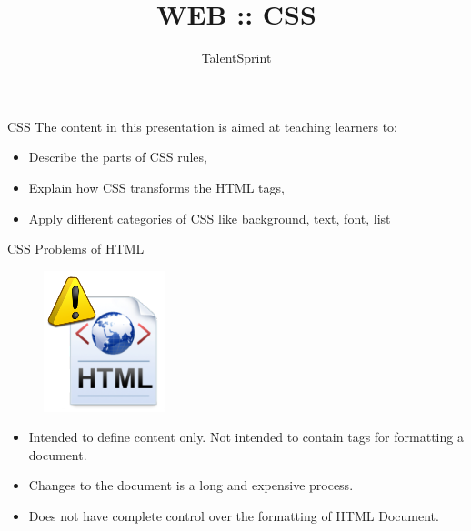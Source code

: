 \documentclass[14pt]{beamer}
\title{WEB :: CSS}
\author[TS]{TalentSprint}
\institute[L\&D]{Licensed To Skill}
\begin{document}
\begin{frame}
  \titlepage
\end{frame}

\begin{frame}{CSS}
The content in this presentation is aimed at teaching  learners to:
  \begin{itemize}
  \item Describe the parts of CSS rules,
  \item Explain how CSS transforms the HTML tags,
  \item Apply different categories of CSS like background, text, font, list
  \end{itemize}
\end{frame}

\begin{frame}{CSS}
Problems of HTML

\vspace{1pc}
\begin{minipage}{1cm}
  \begin{figure}[H]
   \begin{center}
    \includegraphics[scale=.3]{html-problems.png}
   \end{center}
  \end{figure}
 \end{minipage}
 \quad
 \begin{minipage}{9cm}
 \begin{itemize}
 \item Intended to define content only. Not intended to contain tags for formatting a document. 
 \item Changes to the document is a long and expensive process.
 \item Does not have complete control over the formatting of HTML Document.
\end{itemize}
 \end{minipage}
\end{frame}
\end{document}
